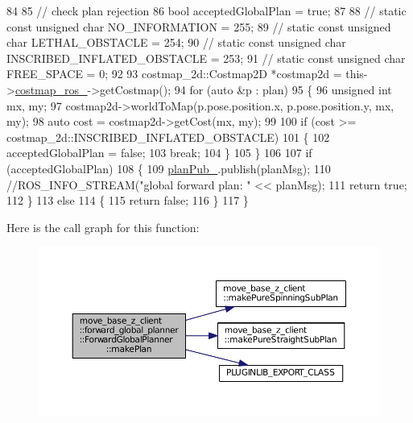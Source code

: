 \begin{DoxyCode}
84 
85     \textcolor{comment}{// check plan rejection}
86     \textcolor{keywordtype}{bool} acceptedGlobalPlan = \textcolor{keyword}{true};
87 
88     \textcolor{comment}{// static const unsigned char NO\_INFORMATION = 255;}
89     \textcolor{comment}{// static const unsigned char LETHAL\_OBSTACLE = 254;}
90     \textcolor{comment}{// static const unsigned char INSCRIBED\_INFLATED\_OBSTACLE = 253;}
91     \textcolor{comment}{// static const unsigned char FREE\_SPACE = 0;}
92 
93     costmap\_2d::Costmap2D *costmap2d = this->\hyperlink{classmove__base__z__client_1_1forward__global__planner_1_1ForwardGlobalPlanner_aba11d85f5f4c9370873195ca97497a22}{costmap\_ros\_}->getCostmap();
94     \textcolor{keywordflow}{for} (\textcolor{keyword}{auto} &p : plan)
95     \{
96         \textcolor{keywordtype}{unsigned} \textcolor{keywordtype}{int} mx, my;
97         costmap2d->worldToMap(p.pose.position.x, p.pose.position.y, mx, my);
98         \textcolor{keyword}{auto} cost = costmap2d->getCost(mx, my);
99 
100         \textcolor{keywordflow}{if} (cost >= costmap\_2d::INSCRIBED\_INFLATED\_OBSTACLE)
101         \{
102             acceptedGlobalPlan = \textcolor{keyword}{false};
103             \textcolor{keywordflow}{break};
104         \}
105     \}
106 
107     \textcolor{keywordflow}{if} (acceptedGlobalPlan)
108     \{
109         \hyperlink{classmove__base__z__client_1_1forward__global__planner_1_1ForwardGlobalPlanner_a324f5df4d47440e1ebddb83ee53d5908}{planPub\_}.publish(planMsg);
110         \textcolor{comment}{//ROS\_INFO\_STREAM("global forward plan: " << planMsg);}
111         \textcolor{keywordflow}{return} \textcolor{keyword}{true};
112     \}
113     \textcolor{keywordflow}{else}
114     \{
115         \textcolor{keywordflow}{return} \textcolor{keyword}{false};
116     \}
117 \}
\end{DoxyCode}


Here is the call graph for this function\+:
\nopagebreak
\begin{figure}[H]
\begin{center}
\leavevmode
\includegraphics[width=350pt]{classmove__base__z__client_1_1forward__global__planner_1_1ForwardGlobalPlanner_a2dcf9aad74efaaa92ee78650f7a23096_cgraph}
\end{center}
\end{figure}





